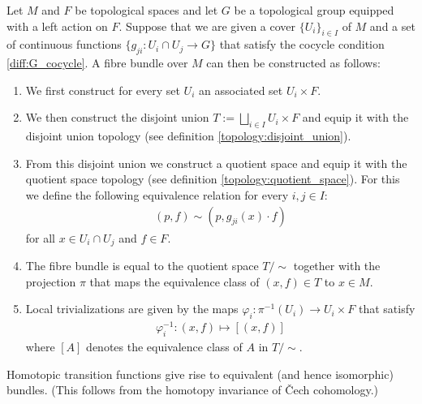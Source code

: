     \begin{construct}\label{manifolds:theorem:fibre_bundle_construction_theorem}
        Let $M$ and $F$ be topological spaces and let $G$ be a topological group equipped with a left action on $F$. Suppose that we are given a cover $\{U_i\}_{i\in I}$ of $M$ and a set of continuous functions $\{g_{ji}:U_i\cap U_j\rightarrow G\}$ that satisfy the cocycle condition \ref{diff:G_cocycle}. A fibre bundle over $M$ can then be constructed as follows:
        \begin{enumerate}
            \item We first construct for every set $U_i$ an associated set $U_i\times F$.
            \item We then construct the disjoint union $T:=\bigsqcup_{i\in I}U_i\times F$ and equip it with the disjoint union topology (see definition \ref{topology:disjoint_union}).
            \item From this disjoint union we construct a quotient space and equip it with the quotient space topology (see definition \ref{topology:quotient_space}). For this we define the following equivalence relation for every $i, j\in I$:
                \begin{gather}
                    (p, f)\sim(p, g_{ji}(x)\cdot f)
                \end{gather}
                for all $x\in U_i\cap U_j$ and $f\in F$.
            \item The fibre bundle is equal to the quotient space $T/\sim$ together with the projection $\pi$ that maps the equivalence class of $(x, f)\in T$ to $x\in M$.
            \item Local trivializations are given by the maps $\varphi_i:\pi^{-1}(U_i)\rightarrow U_i\times F$ that satisfy
                \begin{gather}
                    \varphi_i^{-1}:(x, f)\mapsto [(x, f)]
                \end{gather}
                where $[A]$ denotes the equivalence class of $A$ in $T/\sim$.
        \end{enumerate}
    \end{construct}
    \begin{property}
        Homotopic transition functions give rise to equivalent (and hence isomorphic) bundles. (This follows from the homotopy invariance of \v{C}ech cohomology.)
    \end{property}

